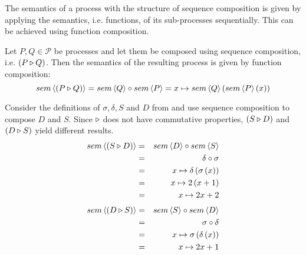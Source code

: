 The semantics of a process with the structure of sequence composition is given by applying the semantics, i.e. functions, of its sub-processes sequentially. This can be achieved using function composition.
\begin{definition}
\label{def:sem_sequence}
Let $P, Q \in \mathcal{P}$ be processes and let them be composed using sequence composition, i.e. $\left( P \triangleright Q \right)$. Then the semantics of the resulting process is given by function composition:
  \begin{equation*}
    \label{eqn:sem_sequence}
    sem \left\langle \left( P \triangleright Q \right) \right\rangle = sem \left\langle Q \right\rangle \circ sem \left\langle P \right\rangle = x \mapsto sem \left\langle Q \right\rangle \left( sem \left\langle P \right\rangle \left( x \right) \right)
  \end{equation*}
  \hfill\qedsymbol
\end{definition}


\begin{example}
\label{exp:sem_sequence}
Consider the definitions of $\sigma, \delta, S$ and $D$ from  and use sequence composition to compose $D$ and $S$. Since $\triangleright$ does not have commutative properties, $\left( S \triangleright D \right)$ and $\left( D \triangleright S \right)$ yield different results.
  \begin{eqnarray*}
    sem \left\langle \left( S \triangleright D \right) \right\rangle & = & sem \left\langle D \right\rangle \circ sem \left\langle S \right\rangle \\
                          & = & \delta \circ \sigma \\
                          & = & x \mapsto \delta \left( \sigma \left( x \right) \right) \\
                          & = & x \mapsto 2 \left( x+1 \right) \\
                          & = & x \mapsto 2x+2
  \end{eqnarray*}
  \begin{eqnarray*}
    sem \left\langle \left( D \triangleright S \right) \right\rangle & = & sem \left\langle S \right\rangle \circ sem \left\langle D \right\rangle \\
                          & = & \sigma \circ \delta \\
                          & = & x \mapsto \sigma \left( \delta \left( x \right) \right) \\
                          & = & x \mapsto 2x + 1
  \end{eqnarray*}
\end{example}


